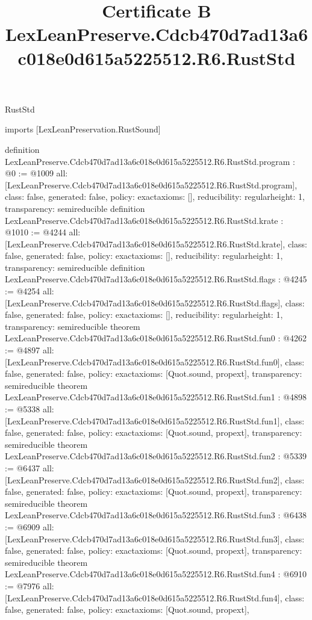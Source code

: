 \begin{lexlean}{RustStd}
\title{Certificate B LexLeanPreserve.Cdcb470d7ad13a6c018e0d615a5225512.R6.RustStd}
\begin{coremodule}
imports [LexLeanPreservation.RustSound]

definition LexLeanPreserve.Cdcb470d7ad13a6c018e0d615a5225512.R6.RustStd.program : @0 := @1009 {
  all: [LexLeanPreserve.Cdcb470d7ad13a6c018e0d615a5225512.R6.RustStd.program],
  class: false,
  generated: false,
  policy: exact{axioms: []},
  reducibility: regular{height: 1},
  transparency: semireducible
}
definition LexLeanPreserve.Cdcb470d7ad13a6c018e0d615a5225512.R6.RustStd.krate : @1010 := @4244 {
  all: [LexLeanPreserve.Cdcb470d7ad13a6c018e0d615a5225512.R6.RustStd.krate],
  class: false,
  generated: false,
  policy: exact{axioms: []},
  reducibility: regular{height: 1},
  transparency: semireducible
}
definition LexLeanPreserve.Cdcb470d7ad13a6c018e0d615a5225512.R6.RustStd.flags : @4245 := @4254 {
  all: [LexLeanPreserve.Cdcb470d7ad13a6c018e0d615a5225512.R6.RustStd.flags],
  class: false,
  generated: false,
  policy: exact{axioms: []},
  reducibility: regular{height: 1},
  transparency: semireducible
}
theorem LexLeanPreserve.Cdcb470d7ad13a6c018e0d615a5225512.R6.RustStd.fun0 : @4262 := @4897 {
  all: [LexLeanPreserve.Cdcb470d7ad13a6c018e0d615a5225512.R6.RustStd.fun0],
  class: false,
  generated: false,
  policy: exact{axioms: [Quot.sound, propext]},
  transparency: semireducible
}
theorem LexLeanPreserve.Cdcb470d7ad13a6c018e0d615a5225512.R6.RustStd.fun1 : @4898 := @5338 {
  all: [LexLeanPreserve.Cdcb470d7ad13a6c018e0d615a5225512.R6.RustStd.fun1],
  class: false,
  generated: false,
  policy: exact{axioms: [Quot.sound, propext]},
  transparency: semireducible
}
theorem LexLeanPreserve.Cdcb470d7ad13a6c018e0d615a5225512.R6.RustStd.fun2 : @5339 := @6437 {
  all: [LexLeanPreserve.Cdcb470d7ad13a6c018e0d615a5225512.R6.RustStd.fun2],
  class: false,
  generated: false,
  policy: exact{axioms: [Quot.sound, propext]},
  transparency: semireducible
}
theorem LexLeanPreserve.Cdcb470d7ad13a6c018e0d615a5225512.R6.RustStd.fun3 : @6438 := @6909 {
  all: [LexLeanPreserve.Cdcb470d7ad13a6c018e0d615a5225512.R6.RustStd.fun3],
  class: false,
  generated: false,
  policy: exact{axioms: [Quot.sound, propext]},
  transparency: semireducible
}
theorem LexLeanPreserve.Cdcb470d7ad13a6c018e0d615a5225512.R6.RustStd.fun4 : @6910 := @7976 {
  all: [LexLeanPreserve.Cdcb470d7ad13a6c018e0d615a5225512.R6.RustStd.fun4],
  class: false,
  generated: false,
  policy: exact{axioms: [Quot.sound, propext]},
}
\end{coremodule}
\end{lexlean}

